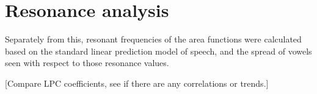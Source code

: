 \section{Resonance analysis}

Separately from this, resonant frequencies of the area functions were calculated based on the standard linear prediction model of speech, and the spread of vowels seen with respect to those resonance values.

[Compare LPC coefficients, see if there are any correlations or trends.]